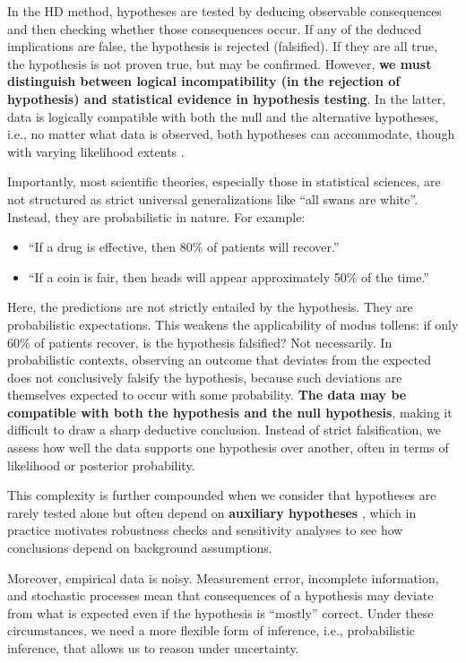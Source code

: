\documentclass[
  12pt,
]{book}
\providecommand{\tightlist}{%
  \setlength{\itemsep}{0pt}\setlength{\parskip}{0pt}}
\begin{document}
In the HD method, hypotheses are tested by deducing observable consequences and then checking whether those consequences occur. If any of the deduced implications are false, the hypothesis is rejected (falsified). If they are all true, the hypothesis is not proven true, but may be confirmed. However, \textbf{we must distinguish between logical incompatibility (in the rejection of hypothesis) and statistical evidence in hypothesis testing}. In the latter, data is logically compatible with both the null and the alternative hypotheses, i.e., no matter what data is observed, both hypotheses can accommodate, though with varying likelihood extents \citep{sep-logical-consequence}.

Importantly, most scientific theories, especially those in statistical sciences, are not structured as strict universal generalizations like ``all swans are white''. Instead, they are probabilistic in nature. For example:

\begin{itemize}
\tightlist
\item
  ``If a drug is effective, then 80\% of patients will recover.''
\item
  ``If a coin is fair, then heads will appear approximately 50\% of the time.''
\end{itemize}

Here, the predictions are not strictly entailed by the hypothesis. They are probabilistic expectations. This weakens the applicability of modus tollens: if only 60\% of patients recover, is the hypothesis falsified? Not necessarily. In probabilistic contexts, observing an outcome that deviates from the expected does not conclusively falsify the hypothesis, because such deviations are themselves expected to occur with some probability. \textbf{The data may be compatible with both the hypothesis and the null hypothesis}, making it difficult to draw a sharp deductive conclusion. Instead of strict falsification, we assess how well the data supports one hypothesis over another, often in terms of likelihood or posterior probability.

This complexity is further compounded when we consider that hypotheses are rarely tested alone but often depend on \textbf{auxiliary hypotheses} \citep{phlogiston}, which in practice motivates robustness checks and sensitivity analyses to see how conclusions depend on background assumptions.

Moreover, empirical data is noisy. Measurement error, incomplete information, and stochastic processes mean that consequences of a hypothesis may deviate from what is expected even if the hypothesis is ``mostly'' correct. Under these circumstances, we need a more flexible form of inference, i.e., probabilistic inference, that allows us to reason under uncertainty.
\end{document}
